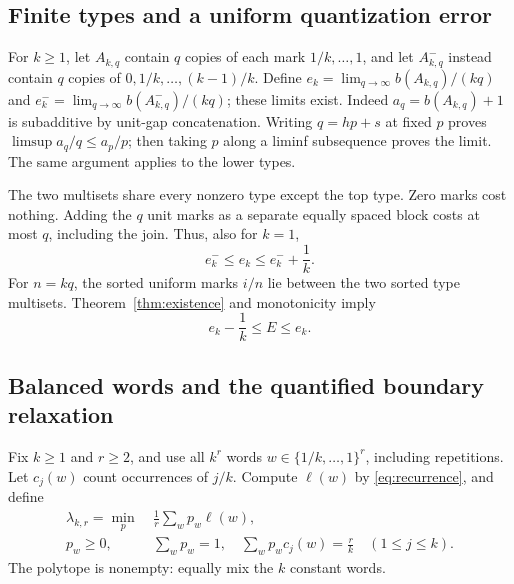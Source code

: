 \documentclass[11pt]{article}
\theoremstyle{definition}\newtheorem{definition}[theorem]{Definition}
\theoremstyle{remark}\newtheorem{remark}[theorem]{Remark}
\begin{document}
\subsection{Finite types and a uniform quantization error}
For $k\ge1$, let $A_{k,q}$ contain $q$ copies of each mark
$1/k,\ldots,1$, and let $A^-_{k,q}$ instead contain $q$ copies of
$0,1/k,\ldots,(k-1)/k$. Define
$e_k=\lim_{q\to\infty}b(A_{k,q})/(kq)$ and
$e^-_k=\lim_{q\to\infty}b(A^-_{k,q})/(kq)$; these limits exist.
Indeed $a_q=b(A_{k,q})+1$ is subadditive by unit-gap concatenation.
Writing $q=hp+s$ at fixed $p$ proves
$\limsup a_q/q\le a_p/p$; then taking $p$ along a liminf subsequence
proves the limit. The same argument applies to the lower types.

The two multisets share every nonzero type except the top type. Zero marks
cost nothing. Adding the $q$ unit marks as a separate equally spaced
block costs at most $q$, including the join. Thus, also for $k=1$,
\[
 e^-_k\le e_k\le e^-_k+\frac1k.
\]
For $n=kq$, the sorted uniform marks $i/n$ lie between the two sorted
type multisets. Theorem~\ref{thm:existence} and monotonicity imply
\begin{equation}\label{eq:types}
 e_k-\frac1k\le E\le e_k.
\end{equation}

\subsection{Balanced words and the quantified boundary relaxation}
Fix $k\ge1$ and $r\ge2$, and use all $k^r$ words
$w\in\{1/k,\ldots,1\}^r$, including repetitions. Let $c_j(w)$ count
occurrences of $j/k$. Compute $\ell(w)$ by \eqref{eq:recurrence}, and define
\begin{equation}\label{eq:lp}
\begin{split}
 \lambda_{k,r}=\min_p\ &\frac1r\sum_w p_w\ell(w),\\
 p_w\ge0,\quad &\sum_w p_w=1,\quad
 \sum_w p_wc_j(w)=\frac rk\quad(1\le j\le k).
\end{split}
\end{equation}
The polytope is nonempty: equally mix the $k$ constant words.
\end{document}
